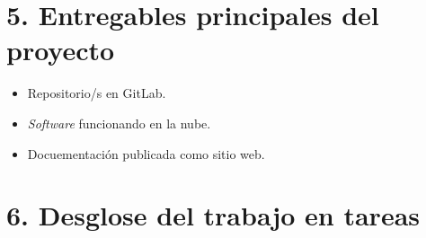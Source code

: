 \documentclass[11pt]{charter}
\begin{document}
\section{5. Entregables principales del proyecto}
\label{sec:entregables}

\begin{itemize}
\item Repositorio/s en GitLab.
\item \textit{Software} funcionando en la nube.
\item Docuementación publicada como sitio web.
\end{itemize}

\section{6. Desglose del trabajo en tareas}
\label{sec:wbs}
\end{document}
